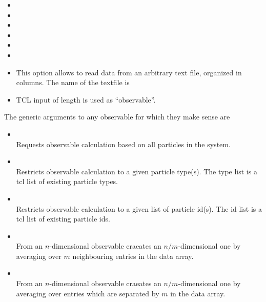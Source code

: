 \begin{itemize}
    \item {}
    \item {}
    \item {}
    \item {}
    \item {}
    \item {}
    \item {}
      This option allows to read data from an arbitrary text file, organized in columns.
      The name of the textfile is 
    \item {} TCL input of length   is used as ``observable''. 
  \end{itemize}

The generic arguments to any observable for which they make sense are
  \begin{itemize}
    \item {} \\
          Requests observable calculation based on all particles in the system.
    \item {}  \\
          Restricts observable calculation to a given particle type(s). The type
	  list is a tcl list of existing particle types.
    \item {}  \\
          Restricts observable calculation to a given list of particle id(s). The id 
	  list is a tcl list of existing particle ids.
    \item {}  \\
          From an $n$-dimensional observable craeates an $n/m$-dimensional one by 
	  averaging over $m$ neighbouring entries in the data array.
    \item {}  \\
          From an $n$-dimensional observable craeates an $n/m$-dimensional one by 
	  averaging over entries which are separated by $m$ in the data array.
  \end{itemize}



